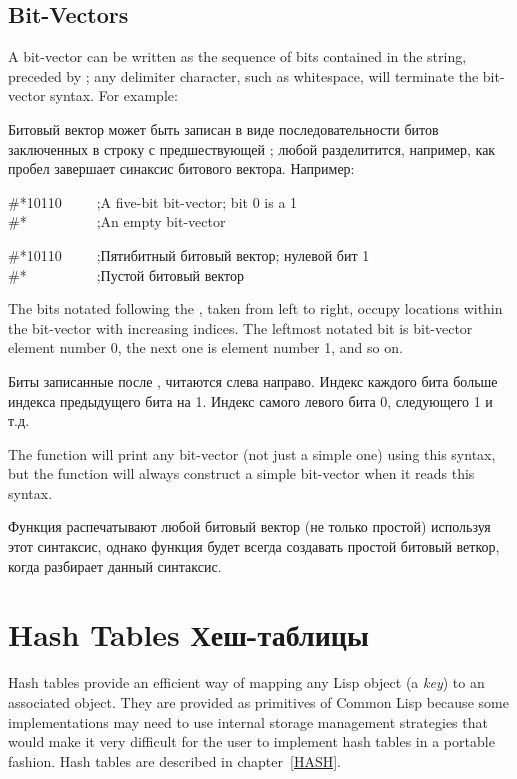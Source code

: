 \subsection{Bit-Vectors}

A bit-vector can be written as the sequence of bits contained in the
string, preceded by \cd{\#*}; any delimiter character, such as whitespace,
will terminate the bit-vector syntax.
For example:

Битовый вектор может быть записан в виде последовательности битов заключенных в
строку с предшествующей \cd{\#*}; любой разделитится, например, как пробел
завершает синаксис битового вектора.
Например:
\begin{lisp}
\#*10110~~~~~;\textrm{A five-bit bit-vector; bit 0 is a 1} \\
\#*~~~~~~~~~~;\textrm{An empty bit-vector}
\end{lisp}

\begin{lisp}
\#*10110~~~~~;\textrm{Пятибитный битовый вектор; нулевой бит 1} \\
\#*~~~~~~~~~~;\textrm{Пустой битовый вектор}
\end{lisp}

The bits notated following the \cd{\#*}, taken from left to right,
occupy locations within the bit-vector with increasing indices.
The leftmost notated bit is bit-vector element number 0, the next one
is element number 1, and so on.

Биты записанные после \cd{\#*}, читаются слева направо. Индекс каждого бита
больше индекса предыдущего бита на 1. Индекс самого левого бита 0, следующего 1
и т.д.

The function  will print any bit-vector (not just a simple one)
using this syntax, but the function  will always construct
a simple bit-vector when it reads this syntax.

Функция  распечатывают любой битовый вектор (не только простой)
используя этот синтаксис, однако функция  будет всегда создавать простой
битовый веткор, когда разбирает данный синтаксис.

\section{Hash Tables Хеш-таблицы}
Hash tables provide an efficient way of mapping any
Lisp object (a \emph{key}) to an associated object.
They are provided as primitives of Common Lisp because
some implementations may need to use internal storage
management strategies that would make it very difficult
for the user to implement hash tables in a portable fashion.
Hash tables are described in chapter~\ref{HASH}.

